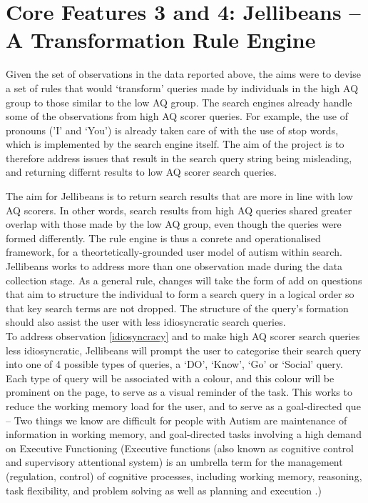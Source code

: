 \documentclass[a4paper, 11pt]{article}
\begin{document}
\section{Core Features 3 and 4: Jellibeans -- A Transformation Rule Engine}
Given the set of observations in the data reported above, the aims were to devise a set of rules that would `transform' queries made by individuals in the high AQ group to those similar to the low AQ group. The search engines already handle some of the observations from high AQ scorer queries. For example, the use of pronouns ('I' and `You') is already taken care of with the use of stop words, which is implemented by the search engine itself. The aim of the project is to therefore address issues that result in the search query string being misleading, and returning differnt results to low AQ scorer search queries. 

The aim for Jellibeans is to return search results that are more in line with low AQ scorers. In other words, search results from high AQ queries shared greater overlap with those made by the low AQ group, even though the queries were formed differently. The rule engine is thus a conrete and operationalised framework, for a theortetically-grounded user model of autism within search. \\

\vspace{5mm} %
Jellibeans works to address more than one observation made during the data collection stage. As a general rule, changes will take the form of add on questions that aim to structure the individual to form a search query in a logical order so that key search terms are not dropped. The structure of the query's formation should also assist the user with less idiosyncratic search queries. \\

\vspace{5mm} %
To address observation \ref{idiosyncracy} and to make high AQ scorer search queries less idiosyncratic, Jellibeans will prompt the user to categorise their search query into one of 4 possible types of queries, a `DO', `Know', `Go' or `Social' query. Each type of query will be associated with a colour, and this colour will be prominent on the page, to serve as a visual reminder of the task. This works to reduce the working memory load for the user, and to serve as a goal-directed que -- Two things we know are difficult for people with Autism are maintenance of information in working memory, and goal-directed tasks involving a high demand on Executive Functioning (Executive functions (also known as cognitive control and supervisory attentional system) is an umbrella term for the management (regulation, control) of cognitive processes, including working memory, reasoning, task flexibility, and problem solving as well as planning and execution \cite{EF}.) 
\end{document}

